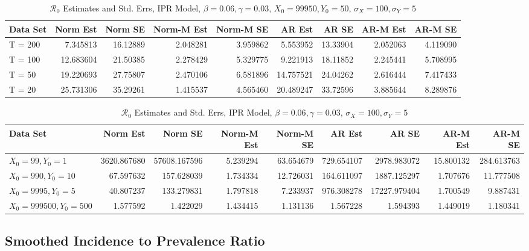 \documentclass[12pt]{article}
\newcommand{\rr}{\ensuremath{\mathcal{R}_0}}
\begin{document}
\begin{table}[H]
	
	\caption{\label{tab:}$\rr$ Estimates and Std. Errs, IPR Model,
		$\beta = 0.06, \gamma = 0.03$, $X_0 = 99950, Y_0 = 50$, $\sigma_X = 100, \sigma_Y = 5$}
	\centering
	\begin{tabular}[t]{l|r|r|r|r|r|r|r|r}
		\hline
		Data Set & Norm Est & Norm SE & Norm-M Est & Norm-M SE & AR Est & AR SE & AR-M Est & AR-M SE\\
		\hline
		T = 200 & 7.345813 & 16.12889 & 2.048281 & 3.959862 & 5.553952 & 13.33904 & 2.052063 & 4.119090\\
		\hline
		T = 100 & 12.683604 & 21.50385 & 2.278429 & 5.329775 & 9.221913 & 18.11852 & 2.245441 & 5.708995\\
		\hline
		T = 50 & 19.220693 & 27.75807 & 2.470106 & 6.581896 & 14.757521 & 24.04262 & 2.616444 & 7.417433\\
		\hline
		T = 20 & 25.731306 & 35.29261 & 1.415537 & 4.565460 & 20.489247 & 33.72596 & 3.885644 & 8.289876\\
		\hline
	\end{tabular}
\end{table}

\begin{table}[H]
	
	\caption{\label{tab:}$\rr$ Estimates and Std. Errs, IPR Model,
		$\beta = 0.06, \gamma = 0.03$, $\sigma_X = 100, \sigma_Y = 5$}
	\centering
	\begin{tabular}[t]{l|r|r|r|r|r|r|r|r}
		\hline
		Data Set & Norm Est & Norm SE & Norm-M Est & Norm-M SE & AR Est & AR SE & AR-M Est & AR-M SE\\
		\hline
		$X_0 = 99, Y_0 = 1$ & 3620.867680 & 57608.167596 & 5.239294 & 63.654679 & 729.654107 & 2978.983072 & 15.800132 & 284.613763\\
		\hline
		$X_0 = 990, Y_0 = 10$ & 67.597632 & 157.628039 & 1.734334 & 12.726031 & 164.611097 & 1887.125297 & 1.707676 & 11.777508\\
		\hline
		$X_0 = 9995, Y_0 = 5$ & 40.807237 & 133.279831 & 1.797818 & 7.233937 & 976.308278 & 17227.979404 & 1.700549 & 9.887431\\
		\hline
		$X_0 = 999500, Y_0 = 500$ & 1.577592 & 1.422029 & 1.434415 & 1.131136 & 1.567228 & 1.594393 & 1.449019 & 1.180341\\
		\hline
	\end{tabular}
\end{table}

\subsection{Smoothed Incidence to Prevalence Ratio}
\end{document}
